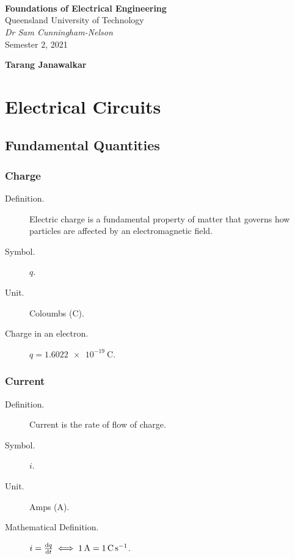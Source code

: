 \documentclass{article}
\title{
    \texorpdfstring{\vspace{2in}}{ }
    \textmd{\textbf{\className}}
	\texorpdfstring{\\}{ }
    \textnormal{\uniTitle}
	\texorpdfstring{\\}{ }
	\texorpdfstring{\vspace{0.3in}}{ }
	\large{\textit{\classInstructorName}}
	\texorpdfstring{\\}{ }
    \classTime
}
\date{}
\newcommand{\uniTitle}{Queensland University of Technology}
\newcommand{\className}{Foundations of Electrical Engineering}
\newcommand{\classTime}{Semester 2, 2021}
\newcommand{\classInstructorName}{Dr Sam Cunningham-Nelson}
\newcommand{\authorName}{Tarang Janawalkar}
\begin{document}
\begin{titlepage}
    \vspace*{\fill}
	\begin{center}
        \LARGE
        \textbf{\className}
        \texorpdfstring{\\}{ }
        \uniTitle
        \texorpdfstring{\\}{ }
        \texorpdfstring{\vspace{0.3in}}{ }
        \normalsize\textit{\classInstructorName}
        \texorpdfstring{\\}{ }
        \classTime
    \end{center}
    \begin{center}
        \textbf{\authorName}
    \end{center}
    \vspace*{\fill}
    \doclicenseThis
    \thispagestyle{empty}
    \newpage
\end{titlepage}

\tableofcontents
\newpage

\section{Electrical Circuits}
\subsection{Fundamental Quantities}
\subsubsection{Charge}
\begin{description}
    \item[Definition.] Electric charge is a fundamental property of matter that governs how particles are affected by an electromagnetic field.
    \item[Symbol.] $q$.
    \item[Unit.] Coloumbs (\unit{\coulomb}).
    \item[Charge in an electron.] $q=\SI{1.6022e-19}{\coulomb}$. 
\end{description}
\subsubsection{Current}
\begin{description}
    \item[Definition.] Current is the rate of flow of charge.
    \item[Symbol.] $i$.
    \item[Unit.] Amps (\unit{\ampere}).
    \item[Mathematical Definition.] $i=\dv{q}{t}\iff\SI{1}{\ampere}=\SI{1}{\coulomb\per\s}$. 
\end{description}
\end{document}
